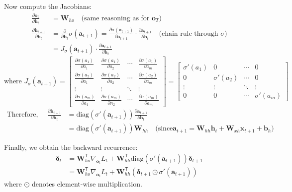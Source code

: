 \begin{notechapter}
Now compute the Jacobians:
\begin{align*}
    \frac{\partial \mathbf{o}_t}{\partial \mathbf{h}_t} &= \mathbf{W}_{ho} \quad \text{(same reasoning as for $\mathbf{o}_T$)} \\
\frac{\partial \mathbf{h}_{t+1}}{\partial \mathbf{h}_t} &=
\frac{\partial}{\partial \mathbf{h}_t} \sigma(\mathbf{a}_{t+1})
    = \frac{\partial \sigma(\mathbf{a}_{t+1})}{\partial \mathbf{a}_{t+1}} \cdot
      \frac{\partial \mathbf{a}_{t+1}}{\partial \mathbf{h}_t}
      \quad \text{(chain rule through $\sigma$)}\\
&= J_{\sigma}(\mathbf{a}_{t+1}) \cdot \frac{\partial \mathbf{a}_{t+1}}{\partial
\mathbf{h}_t}
\end{align*}
%
\begin{equation*}
\text{where } J_{\sigma}(\mathbf{a}_{t+1}) = \begin{bmatrix}
\frac{\partial \sigma(a_1)}{\partial a_1} & \frac{\partial \sigma(a_1)}{\partial a_2} & \cdots & \frac{\partial \sigma(a_1)}{\partial a_m} \\
\frac{\partial \sigma(a_2)}{\partial a_1} & \frac{\partial \sigma(a_2)}{\partial a_2} & \cdots & \frac{\partial \sigma(a_2)}{\partial a_m} \\
\vdots & \vdots & \ddots & \vdots \\
\frac{\partial \sigma(a_m)}{\partial a_1} & \frac{\partial \sigma(a_m)}{\partial
n_2} & \cdots & \frac{\partial \sigma(a_m)}{\partial a_m}
\end{bmatrix}
= \begin{bmatrix}
\sigma'(a_1) & 0 & \cdots & 0 \\
0 & \sigma'(a_2) & \cdots & 0 \\
\vdots & \vdots & \ddots & \vdots \\
0 & 0 & \cdots & \sigma'(a_m)
\end{bmatrix}
\end{equation*}
%
\begin{align*}
    \text{Therefore, } \quad
    \frac{\partial \mathbf{h}_{t+1}}{\partial \mathbf{h}_t} &=
    \text{diag}(\sigma'(\mathbf{a}_{t+1})) \frac{\partial \mathbf{a}_{t+1}}{\partial \mathbf{h}_t} \\
&= \text{diag}(\sigma'(\mathbf{a}_{t+1})) \mathbf{W}_{hh} \quad \text{(since
$\mathbf{a}_{t+1} = \mathbf{W}_{hh}\mathbf{h}_t +
\mathbf{W}_{xh}\mathbf{x}_{t+1} + \mathbf{b}_h$)}
\end{align*}

Finally, we obtain the backward recurrence:
\begin{align*}
    \bm{\delta}_t &= \mathbf{W}_{ho}^\mathsf{T} \nabla_{\mathbf{o}_t} L_t + \mathbf{W}_{hh}^\mathsf{T} \text{diag}(\sigma'(\mathbf{a}_{t+1})) \bm{\delta}_{t+1} \\
&= \mathbf{W}_{ho}^\mathsf{T} \nabla_{\mathbf{o}_t} L_t + \mathbf{W}_{hh}^\mathsf{T} \left(
\bm{\delta}_{t+1} \odot \sigma'(\mathbf{a}_{t+1}) \right)
\end{align*}
where $\odot$ denotes element-wise multiplication.


\end{notechapter}
